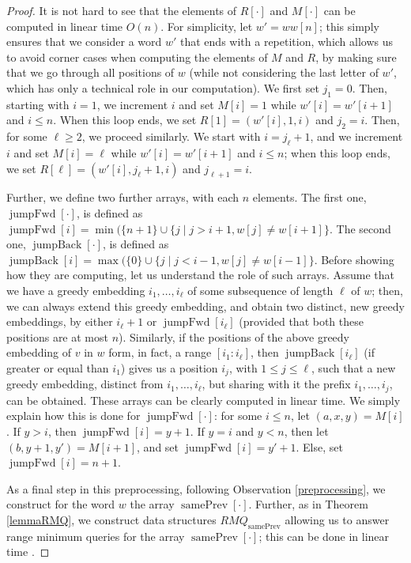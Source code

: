 \documentclass[runningheads,UKenglish,cleveref, autoref, thm-restate]{llncs}
\DeclareMathOperator{\prevArray}{samePrev}
\DeclareMathOperator{\jumpAhead}{{jumpFwd}}
\DeclareMathOperator{\jumpBack}{{jumpBack}}
\begin{document}
\begin{proof}
It is not hard to see that the elements of $R[\cdot]$ and $M[\cdot]$ can be computed in linear time $O(n)$. For simplicity, let $w'=ww[n]$; this simply ensures that we consider a word $w'$ that ends with a repetition, which allows us to avoid corner cases when computing the elements of $M$ and $R$, by making sure that we go through all positions of $w$ (while not considering the last letter of $w'$, which has only a technical role in our computation). We first set $j_1=0$. Then, starting with $i=1$, we increment $i$ and set $M[i]=1$ while $w'[i]=w'[i+1]$ and $i\leq n$. When this loop ends, we set $R[1]=(w'[i], 1, i)$ and $j_2=i$. Then, for some $\ell\geq 2$, we proceed similarly. We start with $i=j_{\ell}+1$, and we increment $i$ and set $M[i]=\ell$ while $w'[i]=w'[i+1]$ and $i\leq n$; when this loop ends, we set $R[\ell]=(w'[i], j_{\ell}+1, i)$ and $j_{\ell+1}=i$.  

Further, we define two further arrays, with each $n$ elements. The first one, $\jumpAhead[\cdot]$, is defined as $\jumpAhead[i]=\min(\{n+1\}\cup \{j\mid j>i+1, w[j] \neq w[i+1]\}$. The second one, $\jumpBack[\cdot]$, is defined as $\jumpBack[i]=\max(\{0\}\cup \{j\mid j<i-1, w[j] \neq w[i-1]\}$. Before showing how they are computing, let us understand the role of such arrays. Assume that we have a greedy embedding $i_1,\ldots,i_\ell$ of some subsequence of length $\ell$ of $w$; then, we can always extend this greedy embedding, and obtain two distinct, new greedy embeddings, by either $i_\ell+1$ or $\jumpAhead[i_\ell]$ (provided that both these positions are at most $n$). Similarly, if the positions of the above greedy embedding of $v$ in $w$ form, in fact, a range $[i_1:i_\ell]$, then $\jumpBack[i_\ell]$ (if greater or equal than $i_1$) gives us a position $i_j$, with $1\leq j\leq \ell$, such that a new greedy embedding, distinct from $i_1,\ldots,i_\ell$, but sharing with it the prefix $i_1,\ldots,i_j$, can be obtained. These arrays can be clearly computed in linear time. We simply explain how this is done for $\jumpAhead[\cdot]$: for some $i\leq n$, let $(a,x,y)=M[i]$. If $y>i$, then $\jumpAhead[i]=y+1$. If $y=i$ and $y<n$, then let $(b,y+1,y')=M[i+1]$, and set $\jumpAhead[i]=y'+1$. Else, set $\jumpAhead[i]=n+1$.

As a final step in this preprocessing, following Observation \ref{preprocessing}, we construct for the word $w$ the array $\prevArray[\cdot]$. Further, as in Theorem \ref{lemmaRMQ}, we construct data structures $RMQ_{\prevArray}$ allowing us to answer range minimum queries for the array $\prevArray[\cdot]$; this can be done in linear time \cite{BenderF02}. 


\end{proof}
\end{document}
